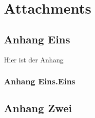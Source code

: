 

\chapter*{Attachments}\label{chapter_anhang}

\section{Anhang Eins}
Hier ist der Anhang

\subsection{Anhang Eins.Eins}

\section{Anhang Zwei}


